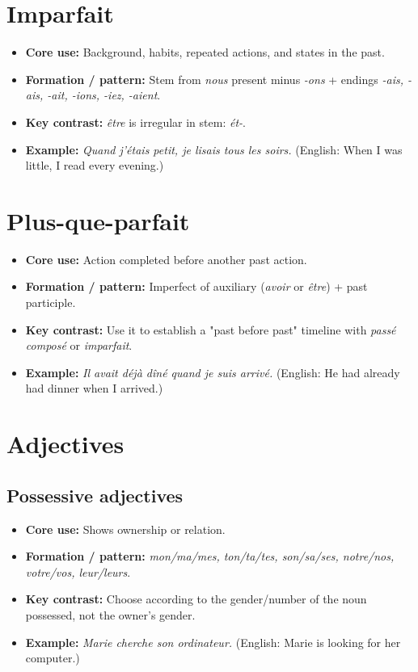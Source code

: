 \documentclass{article}
\begin{document}
\section{Imparfait}
\begin{itemize}
    \item \textbf{Core use:} Background, habits, repeated actions, and states in the past.
    \item \textbf{Formation / pattern:} Stem from \textit{nous} present minus \textit{-ons} + endings \textit{-ais, -ais, -ait, -ions, -iez, -aient}.
    \item \textbf{Key contrast:} \textit{être} is irregular in stem: \textit{ét-}.
    \item \textbf{Example:} \textit{Quand j'étais petit, je lisais tous les soirs.} (English: When I was little, I read every evening.)
\end{itemize}

\section{Plus-que-parfait}
\begin{itemize}
    \item \textbf{Core use:} Action completed before another past action.
    \item \textbf{Formation / pattern:} Imperfect of auxiliary (\textit{avoir} or \textit{être}) + past participle.
    \item \textbf{Key contrast:} Use it to establish a "past before past" timeline with \textit{passé composé} or \textit{imparfait}.
    \item \textbf{Example:} \textit{Il avait déjà dîné quand je suis arrivé.} (English: He had already had dinner when I arrived.)
\end{itemize}

\section{Adjectives}

\subsection{Possessive adjectives}
\begin{itemize}
    \item \textbf{Core use:} Shows ownership or relation.
    \item \textbf{Formation / pattern:} \textit{mon/ma/mes, ton/ta/tes, son/sa/ses, notre/nos, votre/vos, leur/leurs}.
    \item \textbf{Key contrast:} Choose according to the gender/number of the noun possessed, not the owner's gender.
    \item \textbf{Example:} \textit{Marie cherche son ordinateur.} (English: Marie is looking for her computer.)
\end{itemize}
\end{document}
